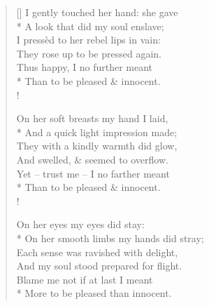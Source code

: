 \documentclass[MAIN]{subfiles}
\begin{document}
\settowidth{\versewidth}{I gently touched her hand: she gave}
\begin{verse}[\versewidth]
I gently touched her hand: she gave\\*
A look that did my soul enslave;\\
I press\`ed to her rebel lips in vain:\\
They rose up to be pressed again.\\
\vin Thus happy, I no further meant\\*
\vin Than to be pleased \& innocent.\\!

On her soft breasts my hand I laid,\\*
And a quick light impression made;\\
They with a kindly warmth did glow,\\
And swelled, \& seemed to overflow.\\
\vin Yet -- trust me -- I no farther meant\\*
\vin Than to be pleased \& innocent.\\!

On her eyes my eyes did stay:\\*
On her smooth limbs my hands did stray;\\
Each sense was ravished with delight,\\
And my soul stood prepared for flight.\\
\vin Blame me not if at last I meant\\*
\vin More to be pleased than innocent.
\end{verse}
\end{document}
